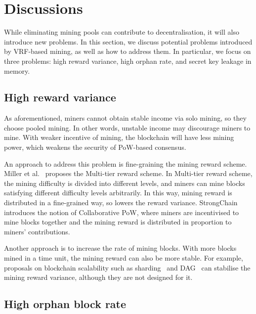 \section{Discussions}
\label{sec:discussions}

While eliminating mining pools can contribute to decentralisation, it will also introduce new problems.
In this section, we discuss potential problems introduced by VRF-based mining, as well as how to address them.
In particular, we focus on three problems: high reward variance, high orphan rate, and secret key leakage in memory.

\subsection{High reward variance}

As aforementioned, miners cannot obtain stable income via solo mining, so they choose pooled mining.
In other words, unstable income may discourage miners to mine.
With weaker incentive of mining, the blockchain will have less mining power, which weakens the security of PoW-based consensus.

An approach to address this problem is fine-graining the mining reward scheme.
Miller et al.~\cite{miller2015nonoutsourceable} proposes the Multi-tier reward scheme.
In Multi-tier reward scheme, the mining difficulty is divided into different levels, and miners can mine blocks satisfying different difficulty levels arbitrarily.
In this way, mining reward is distributed in a fine-grained way, so lowers the reward variance.
StrongChain~\cite{szalachowski2019strongchain} introduces the notion of Collaborative PoW, where miners are incentivised to mine blocks together and the mining reward is distributed in proportion to miners' contributions.

Another approach is to increase the rate of mining blocks.
With more blocks mined in a time unit, the mining reward can also be more stable.
For example, proposals on blockchain scalability such as sharding~\cite{wang2019monoxide} and DAG~\cite{li2018scaling} can stabilise the mining reward variance, although they are not designed for it.





\subsection{High orphan block rate}

